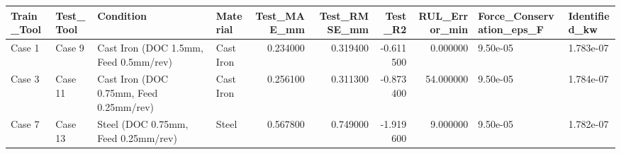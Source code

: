 \begin{tabular}{llllrrrrll}
\toprule
Train_Tool & Test_Tool & Condition & Material & Test_MAE_mm & Test_RMSE_mm & Test_R2 & RUL_Error_min & Force_Conservation_eps_F & Identified_kw \\
\midrule
Case 1 & Case 9 & Cast Iron (DOC 1.5mm, Feed 0.5mm/rev) & Cast Iron & 0.234000 & 0.319400 & -0.611500 & 0.000000 & 9.50e-05 & 1.783e-07 \\
Case 3 & Case 11 & Cast Iron (DOC 0.75mm, Feed 0.25mm/rev) & Cast Iron & 0.256100 & 0.311300 & -0.873400 & 54.000000 & 9.50e-05 & 1.784e-07 \\
Case 7 & Case 13 & Steel (DOC 0.75mm, Feed 0.25mm/rev) & Steel & 0.567800 & 0.749000 & -1.919600 & 9.000000 & 9.50e-05 & 1.782e-07 \\
\bottomrule
\end{tabular}

